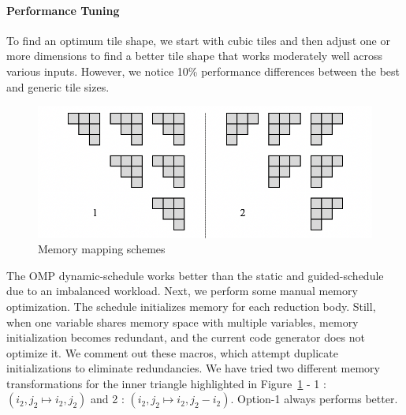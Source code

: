 \paragraph{Performance Tuning}
To find an optimum tile shape, we start with cubic tiles and then adjust one or more dimensions to find a better tile shape that works moderately well across various inputs. However,  we notice 10\% performance differences between the best and generic tile sizes. 
\begin{figure}[htbp]
\begin{adjustbox}{varwidth=\textwidth,margin=0 {\abovecaptionskip} 0 0, frame=0.00pt}
\centerline{\includegraphics[scale=.63]{memory_map_update.png}}
\end{adjustbox}
\caption{Memory mapping schemes}
\label{fig:memory_map_schemes}
\end{figure}
The OMP dynamic-schedule works better than the static and guided-schedule due to an imbalanced workload. Next, we perform some manual memory optimization. The schedule initializes memory for each reduction body. Still, when one variable shares memory space with multiple variables,  memory initialization becomes redundant, and the current code generator does not optimize it. We comment out these macros, which attempt duplicate initializations to eliminate redundancies. We have tried two different memory transformations for the inner triangle highlighted in  Figure~\ref{fig:memory_map_schemes} - 1 : $(i_{2}, j_{2} \mapsto i_{2}, j_{2})$   and 2 : $(i_{2}, j_{2} \mapsto i_{2}, j_{2}-i_{2})$. Option-1 always performs better.


